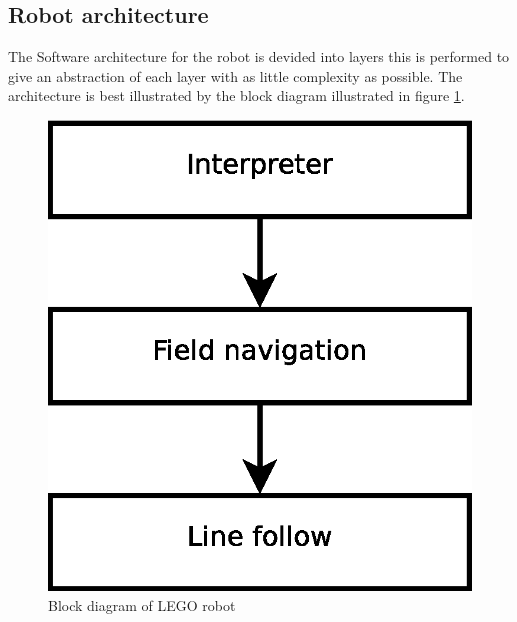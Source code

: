\documentclass[draft, english, a4paper]{article}
\begin{document}
	\subsection{Robot architecture}
	    The Software architecture for the robot is devided into layers
	    this is performed to give an abstraction
	    of each layer with as little complexity as possible. The architecture
	    is best illustrated by the block diagram illustrated in figure \ref{fig:robotBlockDiagram}.
	    \begin{figure}[htp]
            \centering
    	    \includegraphics[scale=0.45]{robotBlockdiagram}
	        \caption{Block diagram of LEGO robot}\label{fig:robotBlockDiagram}
        \end{figure}
\end{document}
